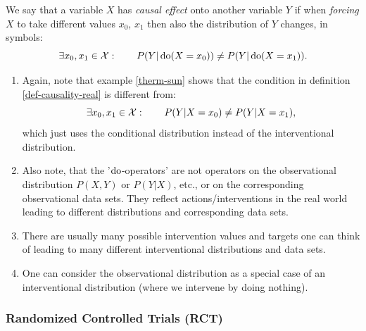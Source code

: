 \begin{Def}
    \label{def-causality-real}
    We say that a variable $X$ has \emph{causal effect} onto another variable $Y$ if
    when \emph{forcing} $X$ to take different values $x_0$, $x_1$ then also the distribution of $Y$ changes, in symbols:
    \[ \exists x_0,x_1 \in \mathcal{X}:\qquad P(Y|\operatorname{do}(X=x_0)) \neq P(Y|\operatorname{do}(X=x_1)). \]
\end{Def}

\begin{Rem}
    \begin{enumerate}
        \item 
    Again, note that example \ref{therm-sun} shows that the condition in definition \ref{def-causality-real} is different from:
    \[ \exists x_0,x_1 \in \mathcal{X}:\qquad P(Y|X=x_0) \neq P(Y|X=x_1), \]
    which just uses the conditional distribution instead of the interventional distribution.
        \item Also note, that the '$\operatorname{do}$-operators' are not operators on the observational distribution $P(X,Y)$ or $P(Y|X)$, etc., or on the corresponding observational data sets. They reflect actions/interventions in the real world leading to different distributions and corresponding data sets. 
        \item There are usually many possible intervention values and targets one can think of leading to many different interventional distributions and data sets.
        \item One can consider the observational distribution as a special case of an interventional distribution (where we intervene by doing nothing).
    \end{enumerate}
\end{Rem}


\subsubsection{Randomized Controlled Trials (RCT)} %


